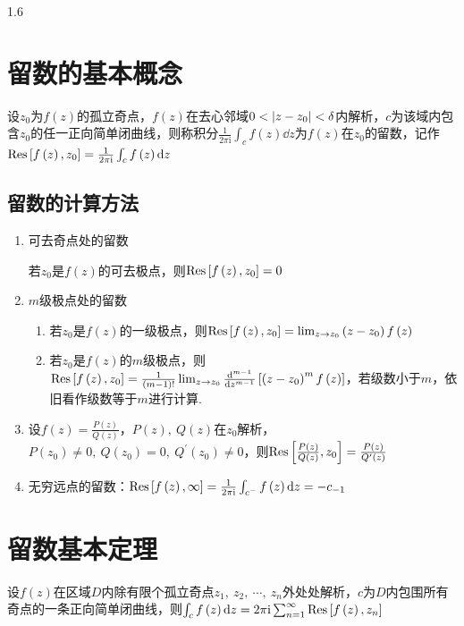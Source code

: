 \documentclass[lang=cn,10pt]{elegantbook}
\renewcommand{\i}{\mathrm{i}}
\begin{document}
\begin{spacing}{1.6}
\section{留数的基本概念}
\begin{definition}
设$z_0$为$f\left(z\right)$的孤立奇点，$f\left(z\right)$在去心邻域$0<\abs{z-z_0}<\delta$内解析，$c$为该域内包含$z_0$的任一正向简单闭曲线，则称积分$\frac{1}{2\pi\i}\int_c{f\left(z\right)\dd z}$为$f\left(z\right)$在$z_0$的留数，记作$\Res\left[f\left(z\right),z_0\right]=\frac{1}{2\pi\i}\int_c{f\left(z\right)\dd z}$
\end{definition}
\subsection{留数的计算方法}
\begin{enumerate}
    \item 可去奇点处的留数
    \begin{theorem}
    若$z_0$是$f\left(z\right)$的可去极点，则$\Res\left[f\left(z\right),z_0\right]=0$
    \end{theorem}
    \item $m$级极点处的留数
    \begin{theorem}
    \begin{enumerate}
        \item 若$z_0$是$f\left(z\right)$的一级极点，则$\Res\left[f\left(z\right),z_0\right]=\lim_{z\to z_0}\left(z-z_0\right)f\left(z\right)$
        \item 若$z_0$是$f\left(z\right)$的$m$级极点，则$\Res\left[f\left(z\right),z_0\right]=\frac{1}{\left(m-1\right)!}\lim_{z\to z_0}\frac{\dd^{m-1}}{\dd z^{m-1}}\left[\left(z-z_0\right)^mf\left(z\right)\right]$，若级数小于$m$，依旧看作级数等于$m$进行计算.
    \end{enumerate}
    \end{theorem}
    \item 设$f\left(z\right)=\frac{P\left(z\right)}{Q\left(z\right)}$，$P\left(z\right),\ Q\left(z\right)$在$z_0$解析，$P\left(z_0\right)\neq 0,\ Q\left(z_0\right)=0,\ Q^{\prime}\left(z_0\right)\neq 0$，则$\Res\left[\frac{P\left(z\right)}{Q\left(z\right)},z_0\right]=\frac{P\left(z\right)}{Q^{\prime}\left(z\right)}$
    \item 无穷远点的留数：$\Res\left[f\left(z\right),\infty\right]=\frac{1}{2\pi\i}\int_{c^-}{f\left(z\right)\dd z}=-c_{-1}$
\end{enumerate}
\section{留数基本定理}
\begin{theorem}
设$f\left(z\right)$在区域$D$内除有限个孤立奇点$z_1,\ z_2,\ \cdots,\ z_n$外处处解析，$c$为$D$内包围所有奇点的一条正向简单闭曲线，则$\int_c{f\left(z\right)\dd z}=2\pi\i\sum_{n=1}^{\infty}{\Res\left[f\left(z\right),z_n\right]}$
\end{theorem}

\end{spacing}
\end{document}

